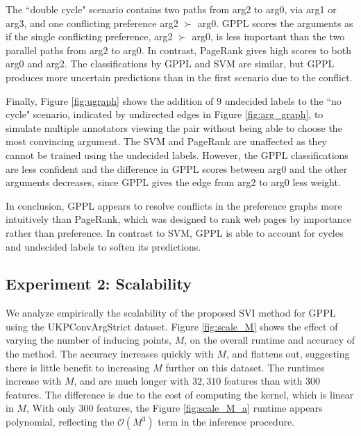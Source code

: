 The ``double cycle" scenario contains two paths from arg2 to arg0, via arg1 or arg3, and one conflicting
preference arg2 $\succ$ arg0. 
GPPL scores the arguments as if the single conflicting preference, arg2 $\succ$ arg0, 
is less important than the two parallel paths from arg2 to arg0. 
In contrast, PageRank gives high scores to both arg0 and arg2.
The classifications by GPPL and SVM are similar, but GPPL produces more uncertain 
predictions than in the first scenario due to the conflict.

Finally,  Figure \ref{fig:ugraph} shows the addition of $9$ undecided labels to the ``no cycle" scenario, indicated by 
undirected edges in Figure \ref{fig:arg_graph}, to simulate multiple annotators viewing the pair without being able to choose the most convincing argument.
The SVM and PageRank are unaffected as they cannot be trained using the undecided labels.
However, the GPPL classifications are less confident and the difference in GPPL scores between arg0 and the other arguments decreases, since GPPL gives the edge from arg2 to arg0 less weight.

In conclusion, GPPL appears to resolve conflicts in the preference graphs
more intuitively than PageRank, which was designed to rank web pages by 
importance rather than preference. 
In contrast to SVM, GPPL is able to account for cycles and undecided labels to soften its predictions.

\subsection{Experiment 2: Scalability}

We analyze empirically the scalability of the proposed SVI method for GPPL using the UKPConvArgStrict dataset.
Figure \ref{fig:scale_M} shows the effect of varying the number of inducing points, $M$, on the overall runtime and accuracy of the method. The accuracy increases quickly with $M$, and flattens out, suggesting there is little benefit to increasing  $M$ further on this dataset. 
The runtimes increase with $M$,  and are much longer with $32,310$ features than with 300 features.
The difference is due to the cost of computing the kernel, which is linear in $M$,
With only $300$ features, the Figure \ref{fig:scale_M_a} runtime appears polynomial, reflecting the 
$\mathcal{O}(M^3)$ term in the inference procedure. 

